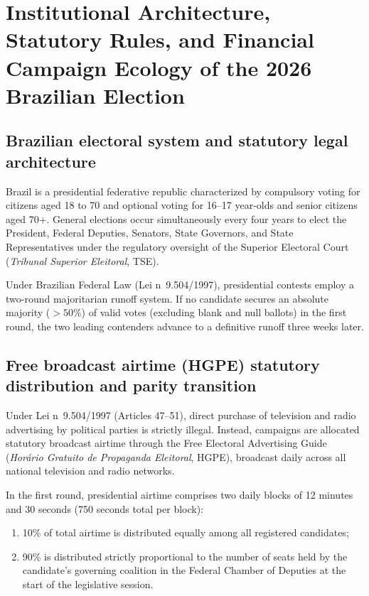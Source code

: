 \documentclass[11pt,a4paper]{article}
\begin{document}
\section{Institutional Architecture, Statutory Rules, and Financial Campaign Ecology of the 2026 Brazilian Election}
\label{snote:institutional_2026_brazil}

\subsection{Brazilian electoral system and statutory legal architecture}
\label{sssec:electoral_legal_framework}
Brazil is a presidential federative republic characterized by compulsory voting for citizens aged 18 to 70 and optional voting for 16--17 year-olds and senior citizens aged 70+. General elections occur simultaneously every four years to elect the President, Federal Deputies, Senators, State Governors, and State Representatives under the regulatory oversight of the Superior Electoral Court (\emph{Tribunal Superior Eleitoral}, TSE).

Under Brazilian Federal Law (Lei n\textordmasculine~9.504/1997), presidential contests employ a two-round majoritarian runoff system. If no candidate secures an absolute majority ($>50\%$) of valid votes (excluding blank and null ballots) in the first round, the two leading contenders advance to a definitive runoff three weeks later.

\subsection{Free broadcast airtime (HGPE) statutory distribution and parity transition}
\label{sssec:hgpe_statutory_details}
Under Lei n\textordmasculine~9.504/1997 (Articles 47--51), direct purchase of television and radio advertising by political parties is strictly illegal. Instead, campaigns are allocated statutory broadcast airtime through the Free Electoral Advertising Guide (\emph{Hor{\'a}rio Gratuito de Propaganda Eleitoral}, HGPE), broadcast daily across all national television and radio networks.

In the first round, presidential airtime comprises two daily blocks of 12 minutes and 30 seconds (750 seconds total per block):
\begin{enumerate}
    \item 10\% of total airtime is distributed equally among all registered candidates;
    \item 90\% is distributed strictly proportional to the number of seats held by the candidate's governing coalition in the Federal Chamber of Deputies at the start of the legislative session.
\end{enumerate}
\end{document}
